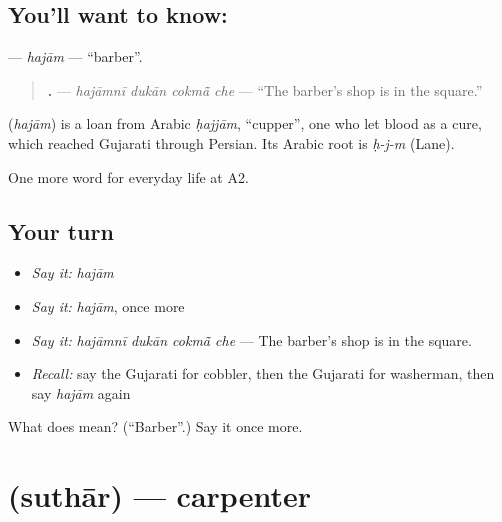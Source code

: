 \subsection*{You'll want to know: }
\textbf{} — \emph{hajām} — \textquotedblleft{}barber\textquotedblright{}.

\begin{quote}
\textbf{   .} — \emph{hajāmnī dukān cokmā̃ che} — \textquotedblleft{}The barber's shop is in the square.\textquotedblright{}
\end{quote}

\begin{cousinweb}
\textbf{} (\emph{hajām}) is a loan from Arabic \emph{ḥajjām}, \textquotedblleft{}cupper\textquotedblright{}, one who let blood as a cure, which reached Gujarati through Persian. Its Arabic root is \emph{ḥ-j-m} (Lane).
\end{cousinweb}

\begin{grammarlens}[title={What you've built}]
One more word for everyday life at A2.
\end{grammarlens}

\subsection*{Your turn}
\begin{itemize}
\raggedright
  \item \emph{Say it:} \emph{hajām}
  \item \emph{Say it:} \emph{hajām}, once more
  \item \emph{Say it:} \emph{hajāmnī dukān cokmā̃ che} — The barber's shop is in the square.
  \item \emph{Recall:} say the Gujarati for cobbler, then the Gujarati for washerman, then say \emph{hajām} again
\end{itemize}

\begin{tcolorbox}[breakable,colback=teal!4,colframe=teal!35!black,title={Before you move on}]
What does  mean? (\textquotedblleft{}Barber\textquotedblright{}.) Say it once more.
\end{tcolorbox}
\section[\texorpdfstring{\gu{સુથાર} (suthār)}{સુથાર (suthār)}]{ (suthār) — carpenter}


